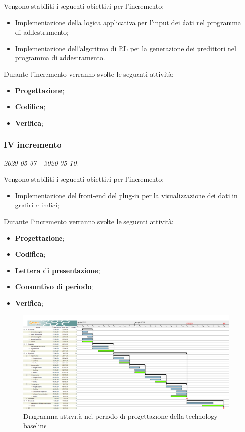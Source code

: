 \documentclass[../piano-di-progetto.tex]{subfiles}
\begin{document}
 Vengono stabiliti i seguenti obiettivi per l'incremento:
 \begin{itemize}
     \item Implementazione della logica applicativa per l'input dei dati nel programma di addestramento;
     \item Implementazione dell'algoritmo di RL per la generazione dei predittori nel programma di addestramento.
 \end{itemize}

Durante l'incremento verranno svolte le seguenti attività: 
\begin{itemize}
    \item \textbf{Progettazione};
    \item \textbf{Codifica};
    \item \textbf{Verifica};
\end{itemize}


\subsubsection{IV incremento}
\emph{2020-05-07 - 2020-05-10}. 
 
 Vengono stabiliti i seguenti obiettivi per l'incremento:
 \begin{itemize}
     \item Implementazione del front-end del plug-in per la visualizzazione dei dati in grafici e indici;
 \end{itemize}

Durante l'incremento verranno svolte le seguenti attività: 
\begin{itemize}
    \item \textbf{Progettazione};
    \item \textbf{Codifica};
    \item \textbf{Lettera di presentazione};
    \item \textbf{Consuntivo di periodo};
    \item \textbf{Verifica};
\end{itemize}



\newpage
\begin{landscape}
    \begin{figure}[H]
        \centering
        \includegraphics[width=24cm]{img/progettazione.png}
        \caption{Diagramma attività nel periodo di progettazione della technology baseline}
      \end{figure}
\end{landscape}
\end{document}
